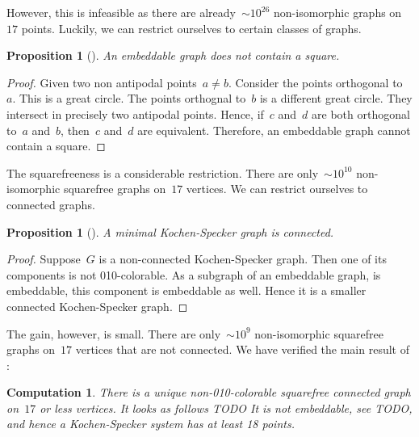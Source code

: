 \documentclass[a4paper]{article}
\newcounter{main}
\newtheorem{prop}[main]{Proposition}
\newtheorem{comp}[main]{Computation}
\theoremstyle{definition}
\theoremstyle{remark}
\begin{document}
However, this is infeasible as there are
already~${\sim}10^{26}$ non-isomorphic
graphs on~$17$ points.
Luckily, we can restrict ourselves to certain classes of graphs.
\begin{prop}[\cite{aow11}]
    An embeddable graph does not contain a square.
\end{prop}
\begin{proof}
    Given two non antipodal points~$a\neq b$.
    Consider the points orthogonal to~$a$.
    This is a great circle.
    The points orthognal to~$b$ is a different great circle.
    They intersect in precisely two antipodal points.
    Hence, if~$c$ and~$d$ are both orthogonal to~$a$ and~$b$,
    then~$c$ and~$d$ are equivalent.
    Therefore, an embeddable graph cannot contain a square.
\end{proof}
The squarefreeness is a considerable restriction.  There are
only~${\sim}10^{10}$ non-isomorphic squarefree graphs on~$17$ vertices.
We can restrict ourselves to connected graphs.
\begin{prop}[\cite{aow11}]\label{prop:ks-conn}
    A minimal Kochen-Specker graph is connected.
\end{prop}
\begin{proof}
    Suppose~$G$ is a non-connected Kochen-Specker graph.
    Then one of its components is not 010-colorable.
    As a subgraph of an embeddable graph, is embeddable,
    this component is embeddable as well.
    Hence it is a smaller connected Kochen-Specker graph.
\end{proof}
The gain, however, is small.
There are only~${\sim}10^9$ non-isomorphic squarefree graphs on~$17$
vertices that are not connected.
We have verified the main result of \cite{aow11}:
\begin{comp}
There is a unique non-010-colorable squarefree connected graph on~$17$ or less
vertices. It looks as follows TODO
It is not embeddable, see TODO, and hence a Kochen-Specker
system has at least 18 points.
\end{comp}
\end{document}
